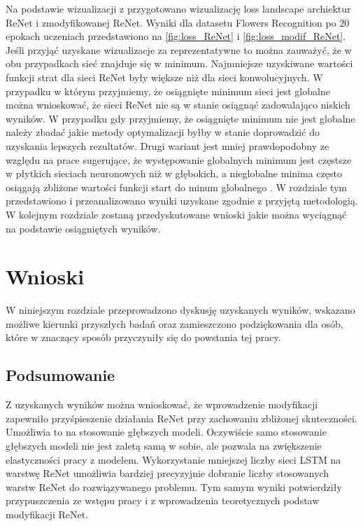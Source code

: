 \documentclass[oneside, mag]{mgr}
\begin{document}
Na podstawie wizualizacji z \cite{DBLP:journals/corr/abs-1712-09913} przygotowano wizualizację loss landscape archiektur ReNet i zmodyfikowanej ReNet. Wyniki dla datasetu Flowers Recognition po 20 epokach uczeniach przedstawiono na \ref{fig:loss_ReNet} i \ref{fig:loss_modif_ReNet}. Jeśli przyjąć uzyskane wizualizacje za reprezentatywne to można zauważyć, że w obu przypadkach sieć znajduje się w minimum. Najmniejsze uzyskiwane wartości funkcji strat dla sieci ReNet były większe niż dla sieci konwolucyjnych. W przypadku w którym przyjmiemy, że osiągnięte minimum sieci jest globalne można wnioskować, że sieci ReNet nie są w stanie osiągnąć zadowalająco niskich wyników. W przypadku gdy przyjmiemy, że osiągnięte minimum nie jest globalne należy zbadać jakie metody optymalizacji byłby w stanie doprowadzić do uzyskania lepszych rezultatów. Drugi wariant jest mniej prawdopodobny ze względu na prace sugerujące, że występowanie globalnych minimum jest częstsze w płytkich sieciach neuronowych niż w głębokich, a nieglobalne minima często osiągają zbliżone wartości funkcji start do minum globalnego \cite{Goodfellow-et-al-2016}. W rozdziale tym przedstawiono i przeanalizowano wyniki uzyskane zgodnie z przyjętą metodologią. W kolejnym rozdziale zostaną przedyskutowane wnioski jakie można wyciągnąć na podstawie osiągniętych wyników.

\chapter{Wnioski}

W niniejszym rozdziale przeprowadzono dyskusję uzyskanych wyników, wskazano możliwe kierunki przyszłych badań oraz zamieszczono podziękowania dla osób, które w znaczący sposób przyczyniły się do powstania tej pracy.

\section{Podsumowanie}

Z uzyskanych wyników można wnioskować, że wprowadzenie modyfikacji zapewniło przyśpieszenie działania ReNet przy zachowaniu zbliżonej skuteczności. Umożliwia to na stosowanie głębszych modeli. Oczywiście samo stosowanie głębszych modeli nie jest zaletą samą w sobie, ale pozwala na zwiększenie elastyczności pracy z modelem. Wykorzystanie mniejszej liczby sieci LSTM na warstwę ReNet umożliwia bardziej precyzyjnie dobranie liczby stosowanych warstw ReNet do rozwiązywanego problemu. Tym samym wyniki potwierdziły przypuszczenia ze wstępu pracy i z wprowadzenia teoretycznych podstaw modyfikacji ReNet.
\end{document}
